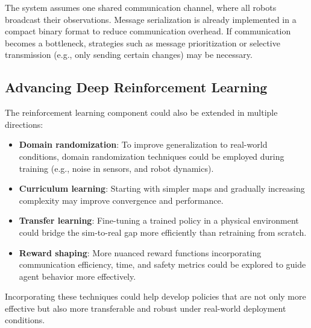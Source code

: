 The system assumes one shared communication channel, where all robots broadcast their observations. 
Message serialization is already implemented in a compact binary format to reduce communication overhead. 
If communication becomes a bottleneck, strategies such as message prioritization or selective transmission (e.g., only sending certain changes) may be necessary.


\subsection{Advancing Deep Reinforcement Learning}
The reinforcement learning component could also be extended in multiple directions:
\begin{itemize}
  \item \textbf{Domain randomization}: To improve generalization to real-world conditions, domain randomization techniques could be employed during training (e.g., noise in sensors, and robot dynamics).
  \item \textbf{Curriculum learning}: Starting with simpler maps and gradually increasing complexity may improve convergence and performance.
  \item \textbf{Transfer learning}: Fine-tuning a trained policy in a physical environment could bridge the sim-to-real gap more efficiently than retraining from scratch.
  \item \textbf{Reward shaping}: More nuanced reward functions incorporating communication efficiency, time, and safety metrics could be explored to guide agent behavior more effectively.
\end{itemize}

Incorporating these techniques could help develop policies that are not only more effective but also more transferable and robust under real-world deployment conditions.
